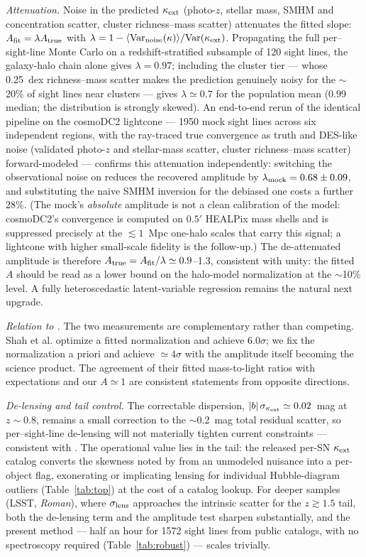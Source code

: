 \documentclass[twocolumn]{aastex701}
\newcommand{\kext}{\kappa_{\rm ext}}
\begin{document}
\emph{Attenuation.} Noise in the predicted $\kext$ (photo-$z$, stellar
mass, SMHM and concentration scatter, cluster richness--mass scatter)
attenuates the fitted slope: $A_{\rm fit} = \lambda A_{\rm true}$ with
$\lambda = 1 - \langle{\rm Var}_{\rm noise}(\kappa)\rangle /
{\rm Var}(\kext)$. Propagating the full per--sight-line Monte Carlo on
a redshift-stratified subsample of 120 sight lines, the galaxy-halo
chain alone gives $\lambda = 0.97$; including the cluster tier ---
whose 0.25~dex richness--mass scatter makes the prediction genuinely
noisy for the $\sim$20\% of sight lines near clusters --- gives
$\lambda \simeq 0.7$ for the population mean (0.99 median; the
distribution is strongly skewed). An end-to-end rerun of the identical
pipeline on the cosmoDC2 lightcone \citep{Korytov2019} --- 1950 mock
sight lines across six independent regions, with the ray-traced true
convergence as truth and DES-like noise (validated photo-$z$ and
stellar-mass scatter, cluster richness--mass scatter) forward-modeled
--- confirms this attenuation independently: switching the
observational noise on reduces the recovered amplitude by
$\lambda_{\rm mock} = 0.68 \pm 0.09$, and substituting the naive SMHM
inversion for the debiased one costs a further 28\%. (The mock's
\emph{absolute} amplitude is not a clean calibration of the model:
cosmoDC2's convergence is computed on $0.5'$ HEALPix mass shells and is
suppressed precisely at the $\lesssim 1$~Mpc one-halo scales that carry
this signal; a lightcone with higher small-scale fidelity is the
follow-up.) The de-attenuated amplitude is therefore
$A_{\rm true} = A_{\rm fit}/\lambda \simeq 0.9$--1.3, consistent with
unity: the fitted $A$ should be read as a lower bound on the halo-model
normalization at the $\sim$10\% level. A fully heteroscedastic
latent-variable regression remains the natural next upgrade.

\emph{Relation to \citet{Shah2024}.} The two measurements are
complementary rather than competing. Shah et al. optimize a fitted
normalization and achieve $6.0\sigma$; we fix the normalization a priori
and achieve $\simeq 4\sigma$ with the amplitude itself becoming the
science product. The agreement of their fitted mass-to-light ratios with
expectations and our $A \simeq 1$ are consistent statements from opposite
directions.

\emph{De-lensing and tail control.} The correctable dispersion,
$|b|\,\sigma_{\kext} \simeq 0.02$~mag at $z \sim 0.8$, remains a small
correction to the $\sim$0.2~mag total residual scatter, so
per--sight-line de-lensing will not materially tighten current
constraints --- consistent with \citet{Shah2024}. The operational value
lies in the tail: the released per-SN $\kext$ catalog converts the
skewness noted by \citet{Abbott2024} from an unmodeled nuisance into a
per-object flag, exonerating or implicating lensing for individual
Hubble-diagram outliers (Table~\ref{tab:top}) at the cost of a catalog
lookup. For deeper samples (LSST, {\it Roman}), where
$\sigma_{\rm lens}$ approaches the intrinsic scatter for the $z \gtrsim
1.5$ tail, both the de-lensing term and the amplitude test sharpen
substantially, and the present method --- half an hour for 1572 sight
lines from public catalogs, with no spectroscopy required
(Table~\ref{tab:robust}) --- scales trivially.
\end{document}
